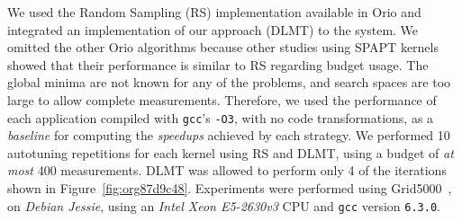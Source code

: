 \documentclass[conference]{IEEEtran}
\begin{document}
We used the Random Sampling (RS) implementation available in Orio and integrated
an implementation of our approach (DLMT) to the system. We omitted the other
Orio algorithms because other studies using SPAPT
kernels~\cite{balaprakash2011can,balaprakash2012experimental} showed that
their performance is similar to RS regarding budget usage. The global minima are
not known for any of the problems, and search spaces are too large to allow
complete measurements. Therefore, we used the performance of each application
compiled with \texttt{gcc}'s \texttt{-O3}, with no code transformations, as a
\emph{baseline} for computing the \emph{speedups} achieved by each strategy. We performed
10 autotuning repetitions for each kernel using RS and DLMT, using a budget of
\emph{at most} 400 measurements. DLMT was allowed to perform only 4 of the iterations
shown in Figure~\ref{fig:org87d9c48}. Experiments were performed using
Grid5000~\cite{balouek2013adding}, on \emph{Debian Jessie}, using an \emph{Intel
Xeon E5-2630v3} CPU and \texttt{gcc} version \texttt{6.3.0}.
\end{document}

